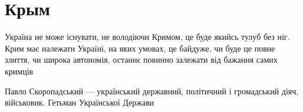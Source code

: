  
 
 
 
 
\chapter{Крым}
\label{sec:topics.krym}








Україна не може існувати, не володіючи Кримом, це буде якийсь тулуб без ніг.
Крим має належати Україні, на яких умовах, це байдуже, чи буде це повне злиття,
чи широка автономія, останнє повинно залежати від бажання самих кримців 

Павло Скоропадський — український державний, політичний і громадський діяч,
військовик. Гетьман Української Держави

